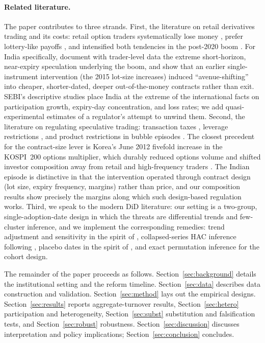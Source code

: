 \documentclass[12pt]{article}
\begin{document}
\paragraph{Related literature.} The paper contributes to three strands.
First, the literature on retail derivatives trading and its costs: retail
option traders systematically lose money
\citep{bauer2009option,barberleeliuodean2009}, prefer lottery-like payoffs
\citep{kumar2009gambling,boyer2014expected}, and intensified both tendencies
in the post-2020 boom \citep{bryzgalova2023retail,dejong2024retail}. For
India specifically, \citet{agarwal2025animal} document with trader-level
data the extreme short-horizon, near-expiry speculation underlying the boom,
and show that an earlier single-instrument intervention (the 2015 lot-size
increases) induced ``avenue-shifting'' into cheaper, shorter-dated, deeper
out-of-the-money contracts rather than exit. SEBI's descriptive studies
place India at the extreme of the international facts on participation
growth, expiry-day concentration, and loss rates; we add quasi-experimental
estimates of a regulator's attempt to unwind them. Second, the literature on
regulating speculative trading: transaction taxes
\citep{umlauf1993transaction,jonesseguin1997}, leverage restrictions
\citep{heimersimsek2019}, and product restrictions in bubble episodes
\citep{xiongyu2011chinese}. The closest precedent for the contract-size
lever is Korea's June 2012 fivefold increase in the KOSPI~200 options
multiplier, which durably reduced options volume and shifted investor
composition away from retail and high-frequency traders
\citep{leeryuwebb2026}. The Indian episode is distinctive in that the
intervention operated through contract design (lot size, expiry frequency,
margins) rather than price, and our composition results show precisely the
margins along which such design-based regulation works. Third, we speak to
the modern DiD literature: our setting is a two-group, single-adoption-date
design in which the threats are differential trends and few-cluster
inference, and we implement the corresponding remedies: trend adjustment
and sensitivity in the spirit of \citet{rambachanroth2023}, collapsed-series
HAC inference following \citet{bertrand2004,donaldlang2007}, placebo dates in
the spirit of \citet{conleytaber2011}, and exact permutation inference for
the cohort design.

The remainder of the paper proceeds as follows. Section~\ref{sec:background}
details the institutional setting and the reform timeline.
Section~\ref{sec:data} describes data construction and validation.
Section~\ref{sec:method} lays out the empirical designs.
Section~\ref{sec:results} reports aggregate-turnover results,
Section~\ref{sec:hetero} participation and heterogeneity,
Section~\ref{sec:subst} substitution and falsification tests, and
Section~\ref{sec:robust} robustness. Section~\ref{sec:discussion} discusses
interpretation and policy implications; Section~\ref{sec:conclusion}
concludes.
\end{document}
